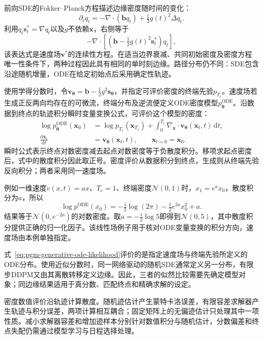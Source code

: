 前向SDE的Fokker--Planck方程描述边缘密度随时间的变化：
\[
  \partial_t q_t
    =-\nabla\cdot(\bm{b}q_t)+\tfrac12g(t)^2\Delta q_t.
\]
利用$q_t\bm{s}_t^*=\nabla q_t$以及$g$不依赖$\bm{x}$，右侧等于
\[
  -\nabla\cdot
       \left[\left(\bm{b}-\tfrac12g(t)^2\bm{s}_t^*\right)q_t\right],
\]
该表达式是速度场$\bm{v}^*$的连续性方程。在适当边界衰减、共同初始密度及密度方程唯一性条件下，两种过程因此具有相同的单时刻边缘。路径分布仍不同：SDE包含沿途随机增量，ODE在给定初始点后采用确定性轨迹。

使用学得分数时，令$\bm{v}_{\bm{\theta}}=\bm{b}-\tfrac12g^2\bm{s}_{\bm{\theta}}$，并指定可评价密度的终端先验$p_{T_{\mathrm{c}}}$。速度场若生成正反两向均存在的可微流，终端分布及逆流便定义ODE密度模型$p_{\bm{\theta}}^{\mathrm{ODE}}$。沿数据到终点的轨迹积分瞬时变量变换公式，可评价这个模型的密度：
\begin{equation}
  \label{eq:pgm-generative-ode-likelihood}
  \begin{aligned}
    \log p_{\bm{\theta}}^{\mathrm{ODE}}(\bm{x}_0)
       &=\log p_{T_{\mathrm{c}}}(\bm{x}_{T_{\mathrm{c}}})
          +\int_0^{T_{\mathrm{c}}}
            \nabla_{\bm{x}}\cdot
            \bm{v}_{\bm{\theta}}(\bm{x}_t,t)\,\mathrm{d}t,\\
    \frac{\mathrm{d}\bm{x}_t}{\mathrm{d}t}
       &=\bm{v}_{\bm{\theta}}(\bm{x}_t,t),
       \qquad \bm{x}_{t=0}=\bm{x}_0.
  \end{aligned}
\end{equation}
瞬时公式表示终点对数密度减去起点对数密度等于负散度积分。移项求起点密度后，式中的散度积分因此取正号。密度评价从数据积分到终点，生成则从终端先验反向积分；两者采用同一速度场。

例如一维速度$v(x,t)=ax$、$T_{\mathrm{c}}=1$、终端密度$\mathcal{N}(0,1)$时，$x_1=e^a x_0$，散度积分为$a$，所以
\[
  \log p^{\mathrm{ODE}}(x_0)
  =-\tfrac12\log(2\pi)-\tfrac12e^{2a}x_0^2+a.
\]
结果等于$\mathcal{N}(0,e^{-2a})$的对数密度。取$a=-\tfrac12\log5$即得到$\mathcal{N}(0,5)$，其中散度积分提供正确的归一化因子。该线性场例子用于核对ODE变量变换的积分方向，速度场由本例单独指定。

式~\eqref{eq:pgm-generative-ode-likelihood}评价的是指定速度场与终端先验所定义的ODE分布。使用近似分数时，同一网络驱动的随机SDE通常定义另一分布，有限步DDPM又由其离散转移定义边缘。因此，三者的似然比较需要先确定模型对象；同边缘结果适用于真分数、匹配终点和精确求解的设定。

密度数值评价沿轨迹计算散度。随机迹估计产生蒙特卡洛误差，有限容差求解器产生轨迹与积分误差，两项计算相互耦合；固定矩阵上的无偏迹估计只处理其中一项性质。减小求解器容差和增加迹样本分别针对数值积分与随机估计，分数偏差和终点失配仍需通过模型学习与日程选择处理。

